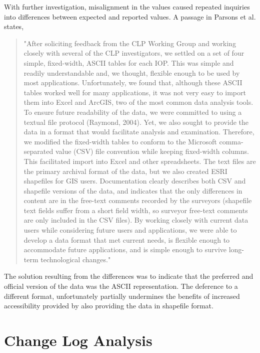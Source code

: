 With further investigation, misalignment in the values caused repeated inquiries into differences between expected and reported values.
A passage in Parsons et al. \cite{CLPX2} states, \begin{quotation}
	"After soliciting feedback from the CLP Working Group and working closely with several of the CLP investigators, we settled on a set of four simple, fixed-width, ASCII tables for each IOP. This was simple and readily understandable and, we thought, flexible enough to be used by most applications. Unfortunately, we found that, although these ASCII tables worked well for many applications, it was not very easy to import them into Excel and ArcGIS, two of the most common data analysis tools. To ensure future readability of the data, we were committed to using a textual file protocol (Raymond, 2004). Yet, we also sought to provide the data in a format that would facilitate analysis and examination. Therefore, we modified the fixed-width tables to conform to the Microsoft comma-separated value (CSV) file convention while keeping fixed-width columns. This facilitated import into Excel and other spreadsheets. The text files are the primary archival format of the data, but we also created ESRI shapefiles for GIS users. Documentation clearly describes both CSV and shapefile versions of the data, and indicates that the only differences in content are in the free-text comments recorded by the surveyors (shapefile text fields suffer from a short field width, so surveyor free-text comments are only included in the CSV files). By working closely with current data users while considering future users and applications, we were able to develop a data format that met current needs, is flexible enough to accommodate future applications, and is simple enough to survive long-term technological changes."
\end{quotation}
The solution resulting from the differences was to indicate that the preferred and official version of the data was the ASCII representation.
The deference to a different format, unfortunately partially undermines the benefits of increased accessibility provided by also providing the data in shapefile format.

\section{Change Log Analysis} \label{sec:CLA}

